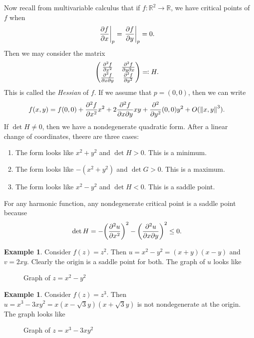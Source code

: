 \documentclass[leqno, openany]{memoir}
\theoremstyle{definition}
\newtheorem{exm}[thm]{Example}
\theoremstyle{remark}
\theoremstyle{plain}
\theoremstyle{definition}
\theoremstyle{remark}
\newcommand{\R}{\mathbb{R}}
\begin{document}
Now recall from multivariable calculus that if $f \colon \R^2 \to \R$, we have critical points of $f$ when 
\[ \eval{ \pdv{f}{x} }_p = \eval{\pdv{f}{y}}_p = 0. \]
Then we may consider the matrix
\[ \mqty( \pdv[2]{f}{x} & \pdv{f}{y}{x} \\ \pdv{f}{x}{y} & \pdv[2]{f}{y} ) \eqqcolon H. \]
This is called the \textit{Hessian} of $f$. If we assume that $p = (0,0)$, then we can write
\[ f(x,y) = f(0,0) + \pdv[2]{f}{x}(0,0) x^2 + 2 \pdv{f}{x}{y} (0,0) xy + \pdv[2]{y}(0,0) y^2 + O(\norm{x,y}^3). \]
If $\det H \neq 0$, then we have a nondegenerate quadratic form. After a linear change of coordinates, theere are three cases:
\begin{enumerate}
    \item The form looks like $x^2 + y^2$ and $\det H > 0$. This is a minimum.
    \item The form looks like $-(x^2 + y^2)$ and $\det G > 0$. This is a maximum.
    \item The form looks like $x^2 - y^2$ and $\det H < 0$. This is a saddle point.
\end{enumerate}
For any harmonic function, any nondegenerate critical point is a saddle point because
\[ \det H = - {\qty(\pdv[2]{u}{x})}^2 - {\qty(\pdv{u}{x}{y})}^2 \leq 0. \]
\begin{exm}
    Consider $f(z) = z^2$. Then $u = x^2 - y^2 = (x+y)(x-y)$ and $v = 2xy$. Clearly the origin is a saddle point for both. The graph of $u$ looks like
    \begin{figure}[H]
    \begin{center}
    \end{center}
    \caption{Graph of $z = x^2 - y^2$}%
    \label{fig:}
    \end{figure}
\end{exm}

\begin{exm}
    Consider $f(z) = z^3$. Then $u = x^3 - 3xy^2 = x(x-\sqrt{3}y)(x+\sqrt{3}y)$ is not nondegenerate at the origin. The graph looks like
    \begin{figure}[H]
    \begin{center}
    \end{center}
    \caption{Graph of $z = x^3 - 3xy^2$}%
    \label{fig:}
    \end{figure}
\end{exm}
\end{document}
